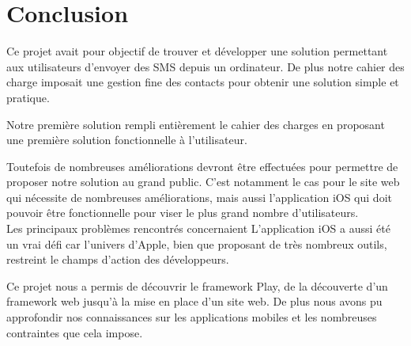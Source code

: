 \cleardoublepage



\chapter*{Conclusion}



Ce projet avait pour objectif de trouver et développer une solution permettant aux utilisateurs d'envoyer des SMS depuis un ordinateur.
De plus notre cahier des charge imposait une gestion fine des contacts pour obtenir une solution simple et pratique.

Notre première solution rempli entièrement le cahier des charges en proposant une première solution fonctionnelle à l'utilisateur.

Toutefois de nombreuses améliorations devront être effectuées pour permettre de proposer notre solution au grand public.
C'est notamment le cas pour le site web qui nécessite de nombreuses améliorations, mais aussi l'application iOS qui doit pouvoir être fonctionnelle pour viser le plus grand nombre d'utilisateurs.
\\


Les principaux problèmes rencontrés concernaient 
L'application iOS a aussi été un vrai défi car l'univers d'Apple, bien que proposant de très nombreux outils, restreint le champs d'action des développeurs.

Ce projet nous a permis de découvrir le framework Play, de la découverte d'un framework web jusqu'à la mise en place d'un site web.
De plus nous avons pu approfondir nos connaissances sur les applications mobiles et les nombreuses contraintes que cela impose.
